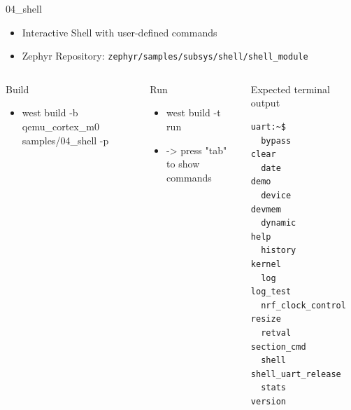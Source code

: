 \documentclass[10pt, aspectratio=169]{beamer}
\begin{document}
\begin{frame}[fragile]{04\_shell}

  \begin{itemize}
     \item Interactive Shell with user-defined commands
     \item Zephyr Repository: \texttt{zephyr/samples/subsys/shell/shell\_module}
  \end{itemize}

  \begin{columns}[T,onlytextwidth]
      \begin{block}{Build}
        \begin{itemize}
          \item {\scriptsize west build -b qemu\_cortex\_m0 samples/04\_shell -p}
        \end{itemize}
      \end{block}

     \begin{block}{Run}
        \begin{itemize}
          \item {\scriptsize west build -t run}
          \item {\scriptsize -> press "tab" to show commands}
        \end{itemize}
      \end{block}



      \begin{exampleblock}{Expected terminal output}

        {\fontsize{7}{9.6}\selectfont
          \begin{verbatim}
uart:~$ 
  bypass              clear
  date                demo
  device              devmem
  dynamic             help
  history             kernel
  log                 log_test
  nrf_clock_control   resize
  retval              section_cmd
  shell               shell_uart_release
  stats               version
          \end{verbatim}
        }
      \end{exampleblock}

  \end{columns}

\end{frame}
\end{document}

